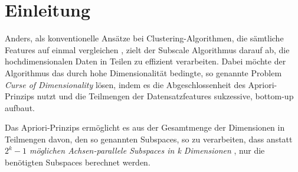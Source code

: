 \section{Einleitung}

Anders, als konventionelle Ansätze bei Clustering-Algorithmen, die sämtliche Features auf einmal
vergleichen \cite{7022654}, zielt der Subscale Algorithmus darauf ab, die hochdimensionalen Daten in Teilen
zu effizient verarbeiten.
Dabei möchte der Algorithmus das durch hohe Dimensionalität bedingte, so genannte Problem \emph{Curse
of Dimensionality} lösen, indem es die Abgeschlossenheit des Apriori-Prinzips
\cite{TechnicalReviewonBuprenorphine:anAlternativeTreatmentforOpioidDependence.1992} nutzt und die
Teilmengen der
Datensatzfeatures sukzessive, bottom-up aufbaut.

Das Apriori-Prinzips ermöglicht es aus der Gesamtmenge der Dimensionen in Teilmengen davon, den
so genannten Subspaces, so zu verarbeiten, dass anstatt \emph{$2^{k}-1$ möglichen Achsen-parallele
Subspaces in \emph{k} Dimensionen} \cite{7022654}, nur die benötigten Subspaces berechnet werden.
